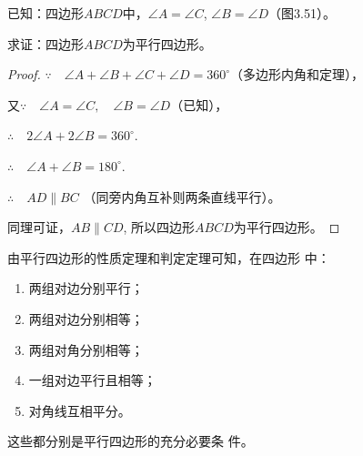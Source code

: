 已知：四边形$ABCD$中，$\angle A=\angle C$, $\angle B=\angle D$（图3.51）。

求证：四边形$ABCD$为平行四边形。

\begin{proof}
$\because\quad \angle A+\angle B+\angle C +\angle D=360^{\circ}$（多边形内角和定理），

又$\because\quad \angle A=\angle C,\quad\angle B=\angle D$（已知），

$\therefore\quad 2\angle A+2\angle B=360^{\circ}$.

$\therefore\quad \angle A+\angle B=180^{\circ}$.

$\therefore\quad AD\parallel BC$ （同旁内角互补则两条直线平行）。

同理可证，$AB\parallel CD$, 所以四边形$ABCD$为平行四边形。
\end{proof}

由平行四边形的性质定理和判定定理可知，在四边形
中：
\begin{enumerate}
    \item 两组对边分别平行；
    \item 两组对边分别相等；
    \item 两组对角分别相等；
    \item 一组对边平行且相等；
    \item 对角线互相平分。
\end{enumerate}
这些都分别是平行四边形的充分必要条
件。











\begin{example}
    
\end{example}

\begin{solution}
    
\end{solution}

\begin{example}
    
\end{example}

\begin{solution}
    
\end{solution}
\begin{example}
    
\end{example}


